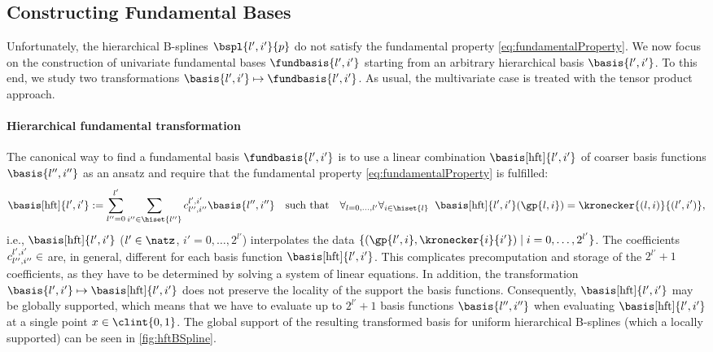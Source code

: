 \subsection{Constructing Fundamental Bases}
\label{sec:442constructingFundamentalBases}

Unfortunately, the hierarchical B-splines $\bspl{l',i'}{p}$ do not
satisfy the fundamental property \eqref{eq:fundamentalProperty}.
We now focus on the construction of univariate fundamental bases
$\fundbasis{l',i'}$ starting from an
arbitrary hierarchical basis $\basis{l',i'}$.
To this end, we study two transformations
$\basis{l',i'} \mapsto \fundbasis{l',i'}$.
As usual, the multivariate case is treated with the
tensor product approach.

\paragraph{Hierarchical fundamental transformation}

The canonical way to find a fundamental basis $\fundbasis{l',i'}$ is to
use a linear combination $\basis[\hft]{l',i'}$
of coarser basis functions $\basis{l'',i''}$ as an ansatz
and require that the fundamental property \eqref{eq:fundamentalProperty}
is fulfilled:
\begin{equation}
  \label{eq:hierarchicalFundamentalTransformation}
  \basis[\hft]{l',i'}
  := \sum_{l''=0}^{l'} \sum_{i'' \in \hiset{l''}}
  c_{l'',i''}^{l',i'} \basis{l'',i''}
  \quad\text{such that}\quad
  \fafalarge{l = 0, \dotsc, l'}{i \in \hiset{l}}{
    \basis[\hft]{l',i'}(\gp{l,i}) = \kronecker{(l,i)}{(l',i')},
  }
\end{equation}
i.e., $\basis[\hft]{l',i'}$ ($l' \in \natz$, $i' = 0, \dotsc, 2^{l'}$)
interpolates the data
$\{(\gp{l',i}, \kronecker{i}{i'}) \mid i = 0, \dotsc, 2^{l'}\}$.
The coefficients $c_{l'',i''}^{l',i'} \in \real$
are, in general, different for each basis function $\basis[\hft]{l',i'}$.
This complicates precomputation and storage of the $2^{l'} + 1$ coefficients,
as they have to be determined by solving a system of linear equations.
In addition, the transformation $\basis{l',i'} \mapsto \basis[\hft]{l',i'}$
does not preserve the locality of the support the basis functions.
Consequently, $\basis[\hft]{l',i'}$ may be globally supported,
which means that we have to evaluate up to $2^{l'} + 1$ basis functions
$\basis{l'',i''}$ when evaluating $\basis[\hft]{l',i'}$ at a single point
$x \in \clint{0, 1}$.
The global support of the resulting transformed basis
for uniform hierarchical B-splines (which a locally supported)
can be seen in \cref{fig:hftBSpline}.

